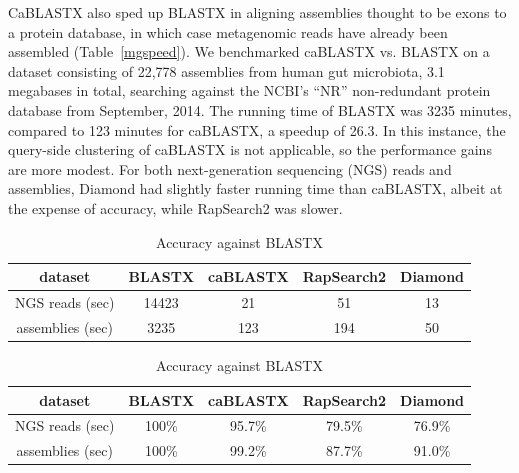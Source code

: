 \documentclass[review,preprint,12pt]{elsarticle}
\theoremstyle{definition}
\theoremstyle{remark}
\numberwithin{equation}{section}
\begin{document}
CaBLASTX also sped up BLASTX in aligning assemblies thought to be exons to a protein
database, in which case metagenomic reads have already been 
assembled (Table~\ref{mgspeed}).
We benchmarked caBLASTX vs. BLASTX on a dataset consisting of 22,778 assemblies
from human gut microbiota, 3.1 megabases in total, searching against the NCBI's
``NR'' non-redundant protein database from September, 2014.
The running time of BLASTX was 3235 minutes, compared to 123 minutes for 
caBLASTX, a speedup of 26.3.
In this instance, the query-side clustering of caBLASTX is not applicable, so
the performance gains are more modest.
For both next-generation sequencing (NGS) reads and assemblies, Diamond had slightly faster running time than caBLASTX, albeit at the expense of accuracy, while RapSearch2 was slower.


\begin{table}
\caption{(a) Running time and (b) accuracy of BLASTX, caBLASTX, RapSearch2, and Diamond}
\begin{subtable}{1\textwidth}
\caption{Running time}
\label{mgspeed}
\begin{tabular}{ccccc}
\hline
dataset & BLASTX & caBLASTX & RapSearch2 & Diamond \\
\hline
NGS reads (sec) & 14423 & 21 & 51 & 13 \\
\hline
assemblies (sec) & 3235 & 123 & 194 & 50 \\
\hline
\end{tabular}
\end{subtable}

\begin{subtable}{1\textwidth}
\caption{Accuracy against BLASTX}
\label{mgacc}
\begin{tabular}{ccccc}
\hline
dataset & BLASTX & caBLASTX & RapSearch2 & Diamond \\
\hline
NGS reads (sec) & 100\% & 95.7\% & 79.5\% & 76.9\% \\
\hline
assemblies (sec) & 100\% & 99.2\% & 87.7\% & 91.0\% \\
\hline
\end{tabular}
\end{subtable}
\end{table}
\end{document}

